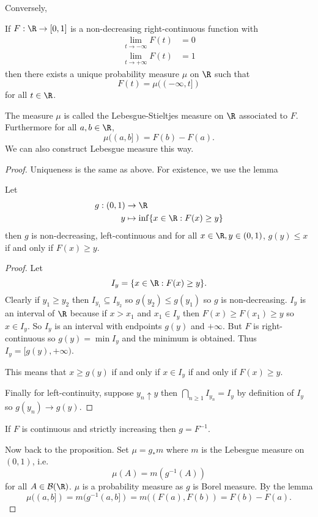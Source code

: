 \documentclass[a4paper]{article}
\begin{document}
Conversely,
\begin{proposition}
  If \(F: \R \to [0, 1]\) is a non-decreasing right-continuous function with
  \begin{align*}
    \lim_{t \to -\infty} F(t) &= 0 \\
    \lim_{t \to +\infty} F(t) &= 1
  \end{align*}
  then there exists a unique probability measure \(\mu\) on \(\R\) such that
  \[
    F(t) = \mu((-\infty, t])
  \]
  for all \(t \in \R\).
\end{proposition}

\begin{remark}
  The measure \(\mu\) is called the Lebesgue-Stieltjes measure on \(\R\) associated to \(F\). Furthermore for all \(a, b \in \R\),
  \[
    \mu((a, b]) = F(b) - F(a).
  \]
  We can also construct Lebesgue measure this way.
\end{remark}

\begin{proof}
  Uniqueness is the same as above. For existence, we use the lemma
  \begin{lemma}
    Let
    \begin{align*}
      g: (0, 1) &\to \R \\
      y &\mapsto \inf \{x \in \R: F(x) \geq y\}
    \end{align*}
    then \(g\) is non-decreasing, left-continuous and for all \(x \in \R, y \in (0, 1)\), \(g(y) \leq x\) if and only if \(F(x) \geq y\).
  \end{lemma}

  \begin{proof}
    Let
    \[
      I_y = \{x \in \R: F(x) \geq y\}.
    \]
    Clearly if \(y_1 \geq y_2\) then \(I_{y_1} \subseteq I_{y_2}\) so \(g(y_2) \leq g(y_1)\) so \(g\) is non-decreasing. \(I_y\) is an interval of \(\R\) because if \(x > x_1\) and \(x_1 \in I_y\) then \(F(x) \geq F(x_1) \geq y\) so \(x \in I_y\). So \(I_y\) is an interval with endpoints \(g(y)\) and \(+ \infty\). But \(F\) is right-continuous so \(g(y) = \min I_y\) and the minimum is obtained. Thus \(I_y = [g(y), + \infty)\).

    This means that \(x \geq g(y)\) if and only if \(x \in I_y\) if and only if \(F(x) \geq y\).

    Finally for left-continuity, suppose \(y_n \uparrow y\) then \(\bigcap_{n \geq 1} I_{y_n} = I_y\) by definition of \(I_y\) so \(g(y_n) \to g(y)\).
  \end{proof}
  \begin{remark}
    If \(F\) is continuous and strictly increasing then \(g = F^{-1}\).
  \end{remark}

  Now back to the proposition. Set \(\mu = g_* m\) where \(m\) is the Lebesgue measure on \((0, 1)\), i.e.
  \[
    \mu(A) = m(g^{-1}(A))
  \]
  for all \(A \in \mathcal B(\R)\). \(\mu\) is a probability measure as \(g\) is Borel measure. By the lemma
  \[
    \mu((a, b]) = m(g^{-1}(a, b]) = m((F(a), F(b)) = F(b) - F(a).
  \]
\end{proof}
\end{document}

